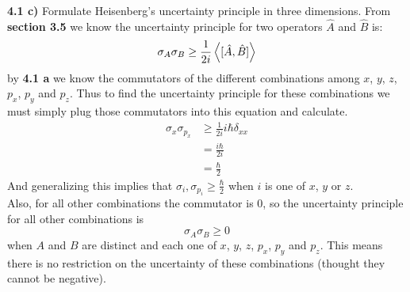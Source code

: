 \documentclass{scrartcl}
\begin{document}
\textbf{4.1 c)} Formulate Heisenberg's uncertainty principle in three dimensions.
From \textbf{section 3.5} we know the uncertainty principle for two operators $\hat{A}$ and $\hat{B}$ is:
\begin{displaymath}
\sigma_A\sigma_B \ge \frac{1}{2i}\expval{[\hat{A},\hat{B}]}
\end{displaymath}
by \textbf{4.1 a} we know the commutators of the different combinations among $x$, $y$, $z$, $p_x$, $p_y$ and $p_z$. Thus to find the uncertainty principle for these combinations we must simply plug those commutators into this equation and calculate.
\begin{align*}
\sigma_x\sigma_{p_x} &\ge \frac{1}{2i}i\hbar\delta_{xx}\\
&=\frac{i\hbar}{2i}\\
&=\frac{\hbar}{2}
\end{align*}
And generalizing this implies that $\sigma_i,\sigma_{p_i}\ge\frac{\hbar}{2}$ when $i$ is one of $x$, $y$ or $z$.\\
Also, for all other combinations the commutator is 0, so the uncertainty principle for all other combinations is
\begin{displaymath}
\sigma_A\sigma_B \ge 0
\end{displaymath}
when $A$ and $B$ are distinct and each one of $x$, $y$, $z$, $p_x$, $p_y$ and $p_z$. This means there is no restriction on the uncertainty of these combinations (thought they cannot be negative).\pagebreak
\end{document}
